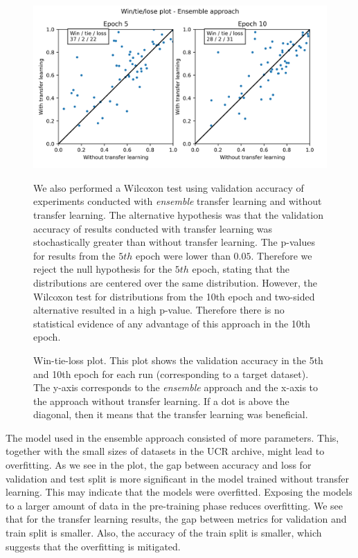 \documentclass[a4paper,11pt,twoside]{report}
\theoremstyle{definition}
\begin{document}
\FloatBarrier
\begin{figure}[h!t]
\centering
\includegraphics[width=17 cm]{imgs/ensemble/win_tie_lose_epoch.png}
\caption{Win-tie-loss plot. This plot shows the validation accuracy in the 5th and 10th epoch for each run (corresponding to a target dataset). The y-axis corresponds to the \textit{ensemble} approach and the x-axis to the approach without transfer learning. If a dot is above the diagonal, then it means that the transfer learning was beneficial.}

We also performed a Wilcoxon test using validation accuracy of experiments conducted with \textit{ensemble} transfer learning and without transfer learning. The alternative hypothesis was that the validation accuracy of results conducted with transfer learning was stochastically greater than without transfer learning. The p-values for results from the $5th$ epoch were lower than $0.05$. Therefore we reject the null hypothesis for the $5th$ epoch, stating that the distributions are centered over the same distribution. However, the Wilcoxon test for distributions from the 10th epoch and two-sided alternative resulted in a high p-value. Therefore there is no statistical evidence of any advantage of this approach in the 10th epoch.
\label{fig:win_tie_loss_ensemble}
\end{figure}
The model used in the ensemble approach consisted of more parameters. This, together with the small sizes of datasets in the UCR archive, might lead to overfitting. As we see in the plot, the gap between accuracy and loss for validation and test split is more significant in the model trained without transfer learning. This may indicate that the models were overfitted. Exposing the models to a larger amount of data in the pre-training phase reduces overfitting. We see that for the transfer learning results, the gap between metrics for validation and train split is smaller. Also, the accuracy of the train split is smaller, which suggests that the overfitting is mitigated.
\end{document}
